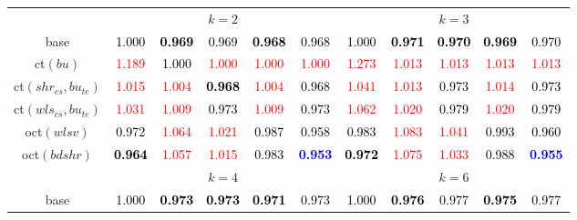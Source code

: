 \begin{tabular}[t]{c|>{}cccc>{}c|ccccc}
\addlinespace[0.3em]
\multicolumn{1}{c}{} & \multicolumn{5}{c}{\textbf{$k = 2$}} & \multicolumn{5}{c}{\textbf{$k = 3$}}\\
base & \textcolor{black}{1.000} & \textcolor{black}{\textbf{0.969}} & \textcolor{black}{0.969} & \textcolor{black}{\textbf{0.968}} & \textcolor{black}{0.968} & \textcolor{black}{1.000} & \textcolor{black}{\textbf{0.971}} & \textcolor{black}{\textbf{0.970}} & \textcolor{black}{\textbf{0.969}} & \textcolor{black}{0.970}\\
ct$(bu)$ & \textcolor{red}{1.189} & \textcolor{black}{1.000} & \textcolor{red}{1.000} & \textcolor{red}{1.000} & \textcolor{red}{1.000} & \textcolor{red}{1.273} & \textcolor{red}{1.013} & \textcolor{red}{1.013} & \textcolor{red}{1.013} & \textcolor{red}{1.013}\\
ct$(shr_{cs}, bu_{te})$ & \textcolor{red}{1.015} & \textcolor{red}{1.004} & \textcolor{black}{\textbf{0.968}} & \textcolor{red}{1.004} & \textcolor{black}{0.968} & \textcolor{red}{1.041} & \textcolor{red}{1.013} & \textcolor{black}{0.973} & \textcolor{red}{1.014} & \textcolor{black}{0.973}\\
ct$(wls_{cs}, bu_{te})$ & \textcolor{red}{1.031} & \textcolor{red}{1.009} & \textcolor{black}{0.973} & \textcolor{red}{1.009} & \textcolor{black}{0.973} & \textcolor{red}{1.062} & \textcolor{red}{1.020} & \textcolor{black}{0.979} & \textcolor{red}{1.020} & \textcolor{black}{0.979}\\
oct$(wlsv)$ & \textcolor{black}{0.972} & \textcolor{red}{1.064} & \textcolor{red}{1.021} & \textcolor{black}{0.987} & \textcolor{black}{0.958} & \textcolor{black}{0.983} & \textcolor{red}{1.083} & \textcolor{red}{1.041} & \textcolor{black}{0.993} & \textcolor{black}{0.960}\\
oct$(bdshr)$ & \textcolor{black}{\textbf{0.964}} & \textcolor{red}{1.057} & \textcolor{red}{1.015} & \textcolor{black}{0.983} & \textcolor{blue}{\textbf{0.953}} & \textcolor{black}{\textbf{0.972}} & \textcolor{red}{1.075} & \textcolor{red}{1.033} & \textcolor{black}{0.988} & \textcolor{blue}{\textbf{0.955}}\\
\addlinespace[0.3em]
\multicolumn{1}{c}{} & \multicolumn{5}{c}{\textbf{$k = 4$}} & \multicolumn{5}{c}{\textbf{$k = 6$}}\\
base & \textcolor{black}{1.000} & \textcolor{black}{\textbf{0.973}} & \textcolor{black}{\textbf{0.973}} & \textcolor{black}{\textbf{0.971}} & \textcolor{black}{0.973} & \textcolor{black}{1.000} & \textcolor{black}{\textbf{0.976}} & \textcolor{black}{0.977} & \textcolor{black}{\textbf{0.975}} & \textcolor{black}{0.977}\\

\end{tabular}
